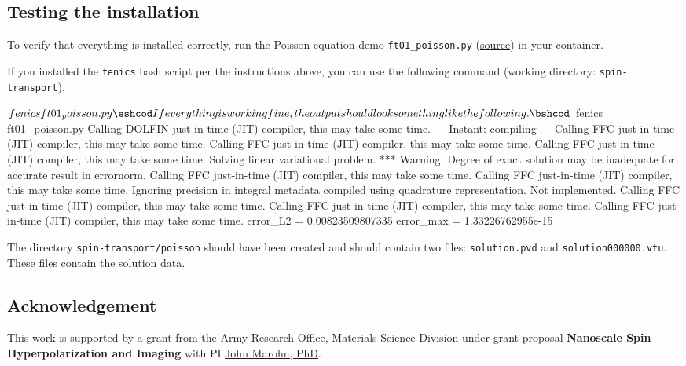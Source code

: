 \documentclass[%
oneside,                 %
final,                   %
10pt]{article}
\begin{document}
\subsection{Testing the installation}

To verify that everything is installed correctly, run the Poisson equation demo \Verb!ft01_poisson.py! (\href{{https://fenicsproject.org/pub/tutorial/html/._ftut1004.html}}{source}) in your container.

If you installed the \texttt{fenics} bash script per the instructions above, you can use the following command (working directory: \texttt{spin-transport}).

\bshcod
$ fenics ft01_poisson.py
\eshcod

If everything is working fine, the output should look something like the following.

\bshcod
$ fenics ft01_poisson.py
Calling DOLFIN just-in-time (JIT) compiler, this may take some time.
--- Instant: compiling ---
Calling FFC just-in-time (JIT) compiler, this may take some time.
Calling FFC just-in-time (JIT) compiler, this may take some time.
Calling FFC just-in-time (JIT) compiler, this may take some time.
Solving linear variational problem.
*** Warning: Degree of exact solution may be inadequate for accurate 
	result in errornorm.
Calling FFC just-in-time (JIT) compiler, this may take some time.
Calling FFC just-in-time (JIT) compiler, this may take some time.
  Ignoring precision in integral metadata compiled using quadrature 
  representation. Not implemented.
Calling FFC just-in-time (JIT) compiler, this may take some time.
Calling FFC just-in-time (JIT) compiler, this may take some time.
Calling FFC just-in-time (JIT) compiler, this may take some time.
error_L2  = 0.00823509807335
error_max = 1.33226762955e-15
\eshcod

The directory \texttt{spin-transport/poisson} should have been created and should contain two files: \texttt{solution.pvd} and \texttt{solution000000.vtu}.
These files contain the solution data.

\subsection{Acknowledgement}

This work is supported by a grant from the Army Research Office, Materials Science Division under grant proposal \textbf{Nanoscale Spin Hyperpolarization and Imaging}
with PI \href{{http://marohn.chem.cornell.edu/}}{John Marohn, PhD}.
\end{document}
